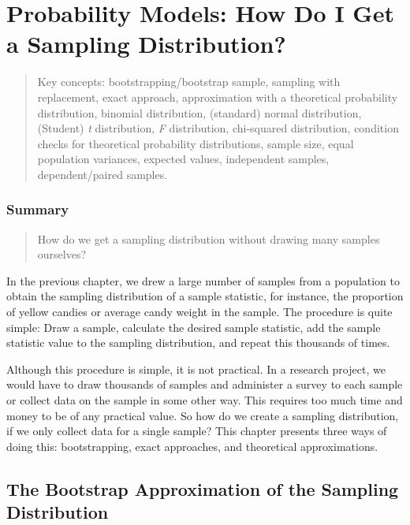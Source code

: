 \documentclass[a4paper]{book}
\theoremstyle{definition}
\theoremstyle{definition}
\theoremstyle{definition}
\theoremstyle{remark}
\begin{document}
\chapter{Probability Models: How Do I Get a Sampling
Distribution?}\label{probmodels}

\begin{quote}
Key concepts: bootstrapping/bootstrap sample, sampling with replacement,
exact approach, approximation with a theoretical probability
distribution, binomial distribution, (standard) normal distribution,
(Student) \emph{t} distribution, \emph{F} distribution, chi-squared
distribution, condition checks for theoretical probability
distributions, sample size, equal population variances, expected values,
independent samples, dependent/paired samples.
\end{quote}

\subsection*{Summary}\label{summary-1}

\begin{quote}
How do we get a sampling distribution without drawing many samples
ourselves?
\end{quote}

In the previous chapter, we drew a large number of samples from a
population to obtain the sampling distribution of a sample statistic,
for instance, the proportion of yellow candies or average candy weight
in the sample. The procedure is quite simple: Draw a sample, calculate
the desired sample statistic, add the sample statistic value to the
sampling distribution, and repeat this thousands of times.

Although this procedure is simple, it is not practical. In a research
project, we would have to draw thousands of samples and administer a
survey to each sample or collect data on the sample in some other way.
This requires too much time and money to be of any practical value. So
how do we create a sampling distribution, if we only collect data for a
single sample? This chapter presents three ways of doing this:
bootstrapping, exact approaches, and theoretical approximations.

\section{The Bootstrap Approximation of the Sampling
Distribution}\label{boot-approx}
\end{document}
